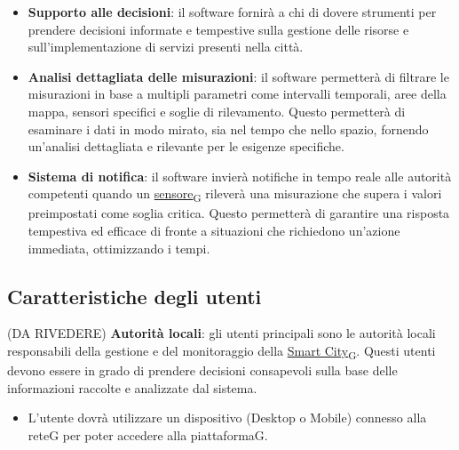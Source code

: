 \begin{itemize}
    \item \textbf{Supporto alle decisioni}: il software fornirà a chi di dovere strumenti per prendere decisioni informate e tempestive sulla gestione delle risorse e sull’implementazione di servizi presenti nella città.
    \item \textbf{Analisi dettagliata delle misurazioni}: il software permetterà di filtrare le misurazioni in base a multipli parametri come intervalli temporali, aree della mappa, sensori specifici e soglie di rilevamento. Questo permetterà di esaminare i dati in modo mirato, sia nel tempo che nello spazio, fornendo un’analisi dettagliata e rilevante per le esigenze specifiche.
    \item \textbf{Sistema di notifica}: il software invierà notifiche in tempo reale alle autorità competenti quando un \href{https://7last.github.io/docs/rtb/documentazione-interna/glossario\#sensore}{sensore\textsubscript{G}} rileverà una misurazione che supera i valori preimpostati come soglia critica. Questo permetterà di garantire una risposta tempestiva ed efficace di fronte a situazioni che richiedono un’azione immediata, ottimizzando i tempi.
\end{itemize}

\subsection{Caratteristiche degli utenti} (DA RIVEDERE)
\textbf{Autorità locali}: gli utenti principali sono le autorità locali responsabili della gestione e del monitoraggio della \href{https://7last.github.io/docs/rtb/documentazione-interna/glossario\#smart-city}{Smart City\textsubscript{G}}. Questi utenti devono essere in grado di prendere decisioni consapevoli sulla base delle informazioni raccolte e analizzate dal sistema.\\
\begin{itemize}
    \item L’utente dovrà utilizzare un dispositivo (Desktop o Mobile) connesso alla reteG per poter accedere alla piattaformaG.
\end{itemize}
